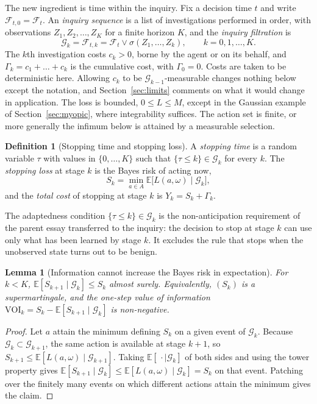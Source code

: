 \documentclass[11pt]{article}
\newcommand{\F}{\mathcal F}
\newcommand{\G}{\mathcal G}
\newcommand{\E}{\mathbb E}
\theoremstyle{plain}
\newtheorem{lemma}{Lemma}
\theoremstyle{definition}
\newtheorem{definition}{Definition}
\begin{document}
The new ingredient is time within the inquiry. Fix a decision time $t$ and write $\F_{t,0}=\F_t$. An \emph{inquiry sequence} is a list of investigations performed in order, with observations $Z_1,Z_2,\dots,Z_K$ for a finite horizon $K$, and the \emph{inquiry filtration} is
\[
\G_k=\F_{t,k}=\F_t\vee\sigma(Z_1,\dots,Z_k),\qquad k=0,1,\dots,K.
\]
The $k$th investigation costs $c_k>0$, borne by the agent or on its behalf, and $\Gamma_k=c_1+\dots+c_k$ is the cumulative cost, with $\Gamma_0=0$. Costs are taken to be deterministic here. Allowing $c_k$ to be $\G_{k-1}$-measurable changes nothing below except the notation, and Section~\ref{sec:limits} comments on what it would change in application. The loss is bounded, $0\le L\le M$, except in the Gaussian example of Section~\ref{sec:myopic}, where integrability suffices. The action set is finite, or more generally the infimum below is attained by a measurable selection.

\begin{definition}[Stopping time and stopping loss]\label{def:stopping}
A \emph{stopping time} is a random variable $\tau$ with values in $\{0,\dots,K\}$ such that $\{\tau\le k\}\in\G_k$ for every $k$. The \emph{stopping loss} at stage $k$ is the Bayes risk of acting now,
\[
S_k=\min_{a\in A}\E\bigl[L(a,\omega)\mid\G_k\bigr],
\]
and the \emph{total cost} of stopping at stage $k$ is $Y_k=S_k+\Gamma_k$.
\end{definition}

The adaptedness condition $\{\tau\le k\}\in\G_k$ is the non-anticipation requirement of the parent essay transferred to the inquiry: the decision to stop at stage $k$ can use only what has been learned by stage $k$. It excludes the rule that stops when the unobserved state turns out to be benign.

\begin{lemma}[Information cannot increase the Bayes risk in expectation]\label{lem:super}
For $k<K$, $\E[S_{k+1}\mid\G_k]\le S_k$ almost surely. Equivalently, $(S_k)$ is a supermartingale, and the one-step value of information $\mathrm{VOI}_k=S_k-\E[S_{k+1}\mid\G_k]$ is non-negative.
\end{lemma}

\begin{proof}
Let $a$ attain the minimum defining $S_k$ on a given event of $\G_k$. Because $\G_k\subset\G_{k+1}$, the same action is available at stage $k+1$, so $S_{k+1}\le \E[L(a,\omega)\mid\G_{k+1}]$. Taking $\E[\,\cdot\mid\G_k]$ of both sides and using the tower property gives $\E[S_{k+1}\mid\G_k]\le\E[L(a,\omega)\mid\G_k]=S_k$ on that event. Patching over the finitely many events on which different actions attain the minimum gives the claim.
\end{proof}
\end{document}
